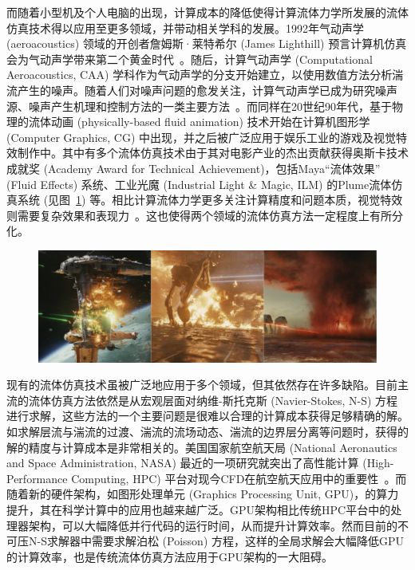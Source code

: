 而随着小型机及个人电脑的出现，计算成本的降低使得计算流体力学所发展的流体仿真技术得以应用至更多领域，并带动相关学科的发展。1992年气动声学 (aeroacoustics) 领域的开创者詹姆斯·莱特希尔 (James Lighthill) 预言计算机仿真会为气动声学带来第二个黄金时代~\citep{hardin1993computational}。随后，计算气动声学 (Computational Aeroacoustics, CAA) 学科作为气动声学的分支开始建立，以使用数值方法分析湍流产生的噪声。随着人们对噪声问题的愈发关注，计算气动声学已成为研究噪声源、噪声产生机理和控制方法的一类主要方法~\citep{RN177}。而同样在20世纪90年代，基于物理的流体动画 (physically-based fluid animation) 技术开始在计算机图形学 (Computer Graphics, CG) 中出现，并之后被广泛应用于娱乐工业的游戏及视觉特效制作中。其中有多个流体仿真技术由于其对电影产业的杰出贡献获得奥斯卡技术成就奖 (Academy Award for Technical Achievement)，包括Maya“流体效果” (Fluid Effects) 系统、工业光魔 (Industrial Light \& Magic, ILM) 的Plume流体仿真系统 (见图~\ref{img:star_wars}) 等。相比计算流体力学更多关注计算精度和问题本质，视觉特效则需要复杂效果和表现力~\citep{C1}。这也使得两个领域的流体仿真方法一定程度上有所分化。

\begin{figure}[htbp]
  \centering
    \includegraphics[width=0.99\columnwidth]{figures/star_wars.png}
  \label{img:star_wars}
\end{figure}

现有的流体仿真技术虽被广泛地应用于多个领域，但其依然存在许多缺陷。目前主流的流体仿真方法依然是从宏观层面对纳维-斯托克斯 (Navier-Stokes, N-S) 方程进行求解，这些方法的一个主要问题是很难以合理的计算成本获得足够精确的解。如求解层流与湍流的过渡、湍流的流场动态、湍流的边界层分离等问题时，获得的解的精度与计算成本是非常相关的。美国国家航空航天局 (National Aeronautics and Space Administration, NASA) 最近的一项研究就突出了高性能计算 (High-Performance Computing, HPC) 平台对现今CFD在航空航天应用中的重要性~\citep{slotnick2014cfd}。而随着新的硬件架构，如图形处理单元 (Graphics Processing Unit, GPU)，的算力提升，其在科学计算中的应用也越来越广泛。GPU架构相比传统HPC平台中的处理器架构，可以大幅降低并行代码的运行时间，从而提升计算效率。然而目前的不可压N-S求解器中需要求解泊松 (Poisson) 方程，这样的全局求解会大幅降低GPU的计算效率，也是传统流体仿真方法应用于GPU架构的一大阻碍。

